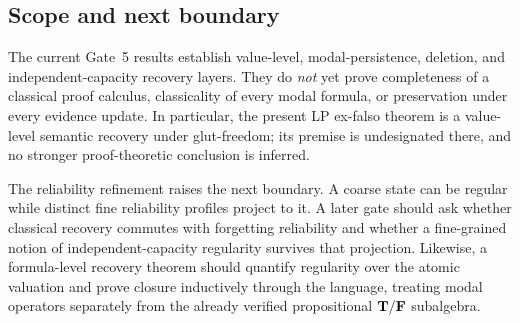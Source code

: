 \subsection{Scope and next boundary}

The current Gate~5 results establish value-level, modal-persistence, deletion, and
independent-capacity recovery layers.  They do \emph{not} yet prove completeness of a
classical proof calculus, classicality of every modal formula, or preservation under
every evidence update.  In particular, the present LP ex-falso theorem is a
value-level semantic recovery under glut-freedom; its premise is undesignated there,
and no stronger proof-theoretic conclusion is inferred.

The reliability refinement raises the next boundary.  A coarse state can be regular
while distinct fine reliability profiles project to it.  A later gate should ask
whether classical recovery commutes with forgetting reliability and whether a
fine-grained notion of independent-capacity regularity survives that projection.
Likewise, a formula-level recovery theorem should quantify regularity over the atomic
valuation and prove closure inductively through the language, treating modal operators
separately from the already verified propositional \(\mathbf{T}/\mathbf{F}\) subalgebra.
